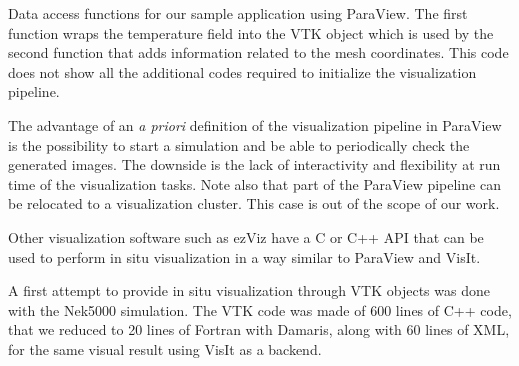 \begin{Listing}
	
	\caption[In situ data access functions using ParaView]{Data access functions for our sample application using ParaView. 
	The first function wraps the temperature field into the VTK object which is used by 
	the second function that adds information related to the mesh coordinates. 
	This code does not show all the additional codes required to initialize
	the visualization pipeline.
	}\label{lst:paraviewaccess}
\end{Listing}

The advantage of an \emph{a priori} definition of the visualization pipeline in 
ParaView is the possibility to start a simulation and be able to periodically
check the generated images. The downside is the lack
of interactivity and flexibility at run time of the visualization tasks. 
Note also that part of the ParaView pipeline can be relocated to 
a visualization cluster. This case is out of the scope of our work.

Other visualization software such as ezViz have a C or C++ API that
can be used to perform in situ visualization in a way similar to ParaView and VisIt.

A first attempt to provide in situ visualization through VTK objects was done
with the Nek5000 simulation. The
VTK code was made of 600 lines of C++ code, that we reduced to 20 lines of
Fortran with Damaris, along with 60 lines of XML, for the same visual result 
using VisIt as a backend.




